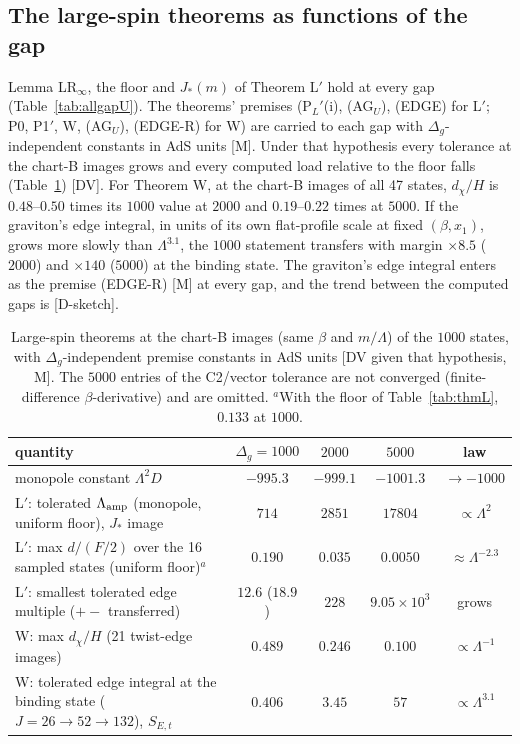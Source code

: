 \documentclass[aps,prl,onecolumn,superscriptaddress,nofootinbib]{revtex4-2}
\begin{document}
\subsection{The large-spin theorems as functions of the gap}
Lemma LR$_\infty$, the floor and $J_*(m)$ of Theorem L$'$ hold at every gap (Table~\ref{tab:allgapU}). The theorems' premises
(P$_L'$(i), (AG$_U$), (EDGE) for L$'$; P0, P1$'$, W, (AG$_U$), (EDGE-R) for W) are carried to each gap with $\Delta_g$-independent
constants in AdS units [M]. Under that hypothesis every tolerance at the chart-B images grows and every computed load relative to the
floor falls (Table~\ref{tab:lsgap}) [DV]. For Theorem W, at the chart-B images of all 47 states, $d_\chi/H$ is $0.48$--$0.50$ times its
$1000$ value at $2000$ and $0.19$--$0.22$ times at $5000$. If the graviton's edge integral, in units of its own flat-profile scale at
fixed $(\beta,x_1)$, grows more slowly than $\Lambda^{3.1}$, the $1000$ statement transfers with margin $\times8.5$ ($2000$) and $\times140$
($5000$) at the binding state. The graviton's edge integral enters as the premise (EDGE-R) [M] at every gap, and the trend between the computed gaps is
[D-sketch].

\begin{table}[!htbp]
\caption{\label{tab:lsgap}Large-spin theorems at the chart-B images (same $\beta$ and $m/\Lambda$) of the $1000$ states, with
$\Delta_g$-independent premise constants in AdS units [DV given that hypothesis, M]. The $5000$ entries of the C2/vector tolerance
are not converged (finite-difference $\beta$-derivative) and are omitted. $^a$With the floor of Table~\ref{tab:thmL}, $0.133$ at $1000$.}
\footnotesize
\begin{ruledtabular}
\begin{tabular}{lcccc}
quantity & $\Delta_g=1000$ & $2000$ & $5000$ & law\\\hline
monopole constant $\Lambda^2D$ & $-995.3$ & $-999.1$ & $-1001.3$ & $\to-1000$\\
L$'$: tolerated $\Lambda_{\rm amp}$ (monopole, uniform floor), $J_*$ image & $714$ & $2851$ & $17804$ & $\propto\Lambda^2$\\
L$'$: max $d/(F/2)$ over the 16 sampled states (uniform floor)$^a$ & $0.190$ & $0.035$ & $0.0050$ & $\approx\Lambda^{-2.3}$\\
L$'$: smallest tolerated edge multiple ($+-$ transferred) & $12.6$ ($18.9$) & $228$ & $9.05\times10^3$ & grows\\
W: max $d_\chi/H$ (21 twist-edge images) & $0.489$ & $0.246$ & $0.100$ & $\propto\Lambda^{-1}$\\
W: tolerated edge integral at the binding state ($J=26\to52\to132$), $S_{E,t}$ & $0.406$ & $3.45$ & $57$ & $\propto\Lambda^{3.1}$\\
\end{tabular}
\end{ruledtabular}
\end{table}
\end{document}

